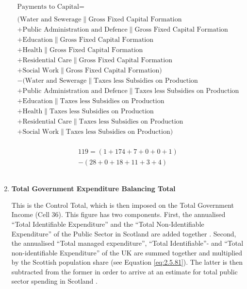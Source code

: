 \begin{enumerate}
\begin{equation}
\begin{split}
\text{Payments to Capital} =  \\ \\
(\text{Water and Sewerage}\|\text{Gross Fixed Capital Formation}\\
+\text{Public Administration and Defence}\|\text{Gross Fixed Capital Formation}\\
+\text{Education}\|\text{Gross Fixed Capital Formation}\\
+\text{Health}\|\text{Gross Fixed Capital Formation}\\
+\text{Residential Care}\|\text{Gross Fixed Capital Formation}\\
+\text{Social Work}\|\text{Gross Fixed Capital Formation})\\
-(\text{Water and Sewerage}\|\text{Taxes less Subsidies on Production}\\
+\text{Public Administration and Defence}\|\text{Taxes less Subsidies on Production}\\
+\text{Education}\|\text{Taxes less Subsidies on Production}\\
+\text{Health}\|\text{Taxes less Subsidies on Production}\\
+\text{Residential Care}\|\text{Taxes less Subsidies on Production}\\
+\text{Social Work}\|\text{Taxes less Subsidies on Production})\\
\end{split} \label{eq:2.5.46}
\end{equation}

\begin{equation} \nonumber
\begin{split}
119 = (1+174+7+0+0+1)\\
-(28+0+18+11+3+4)
\end{split}
\end{equation}\\

\newpage

\item \textbf {Total Government Expenditure Balancing Total}

This is the Control Total, which is then imposed on the Total Government Income (Cell 36). This figure has two components. First, the annualised ``Total Identifiable Expenditure'' and the ``Total Non-Identifiable Expenditure'' of the Public Sector in Scotland are added together \cite{ScotGov2013b}. Second, the annualised ``Total managed expenditure'', ``Total Identifiable''- and ``Total non-identifiable Expenditure'' of the UK are summed together and multiplied by the Scottish population share (see Equation \ref{eq:2.5.81}). The latter is then subtracted from the former in order to arrive at an estimate for total public sector spending in Scotland \cite{HMTR2012,ONS2011a}.\\



\end{enumerate}

